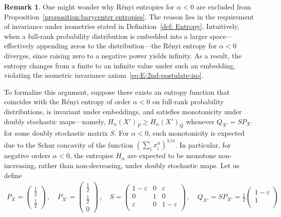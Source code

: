 \documentclass[aps,pra,11pt,onecolumn,nofootinbib,tightenlines]{revtex4-2}
\theoremstyle{definition}
\newtheorem{remark}[theorem]{Remark}
\begin{document}
\begin{remark}
\label{remark: negative alpha dilemma}
  One might wonder why Rényi entropies for $\alpha < 0$ are excluded from Proposition~\ref{proposition:barycenter entropies}. The reason lies in the requirement of invariance under isometries stated in Definition~\ref{def: Entropy}. Intuitively, when a full-rank probability distribution is embedded into a larger space—effectively appending zeros to the distribution—the Rényi entropy for $\alpha < 0$ diverges, since raising zero to a negative power yields infinity. As a result, the entropy changes from a finite to an infinite value under such an embedding, violating the isometric invariance axiom~\ref{eq:E-2nd-postulate-iso}.

To formalize this argument, suppose there exists an entropy function that coincides with the Rényi entropy of order $\alpha < 0$ on full-rank probability distributions, is invariant under embeddings, and satisfies monotonicity under doubly stochastic maps—namely, $H_\alpha(X')_P \geq H_\alpha(X')_Q$ whenever $Q_{X'} = S P_{X'}$ for some doubly stochastic matrix $S$. For $\alpha < 0$, such monotonicity is expected due to the Schur concavity of the function $\left( \sum_i x_i^\alpha \right)^{1/\alpha}$. In particular, for negative orders $\alpha<0$, the entropies $H_\alpha$ are expected to be monotone non-increasing, rather than non-decreasing, under doubly stochastic maps.
 Let us define
    \begin{align}
    P_X=\begin{pmatrix}
        \frac{1}{2} \\
        \frac{1}{2}
    \end{pmatrix} \,, \quad
    P_{X'}=\begin{pmatrix}
        \frac{1}{2} \\
        \frac{1}{2}  \\
        0
    \end{pmatrix} 
\,,\quad S=\begin{pmatrix}
            1-\varepsilon & 0 & \varepsilon \\
            0& 1 & 0\\
            \varepsilon & 0 & 1-\varepsilon \\
        \end{pmatrix} \,, \quad 
       Q_{X'} = SP_{X'} = \frac{1}{2}
       \begin{pmatrix}
           1-\varepsilon\\
           1\\

\end{pmatrix}
\end{align}
\end{remark}
\end{document}
